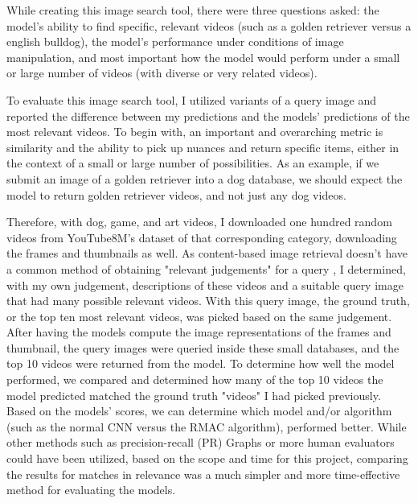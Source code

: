 \documentclass[10pt,twocolumn]{article}
\begin{document}
While creating this image search tool, there were three questions asked: the model's ability to find specific, relevant videos (such as a golden retriever versus a english bulldog), the model's performance under conditions of image manipulation, and most important how the model would perform under a small or large number of videos (with diverse or very related videos).

To evaluate this image search tool, I utilized variants of a query image and reported the difference between my predictions and the models' predictions of the most relevant videos. To begin with, an important and overarching metric is similarity and the ability to pick up nuances and return specific items, either in the context of a small or large number of possibilities. As an example, if we submit an image of a golden retriever into a dog database, we should expect the model to return golden retriever videos, and not just any dog videos.

Therefore, with dog, game, and art videos, I downloaded one hundred random videos from YouTube8M's dataset of that corresponding category, downloading the frames and thumbnails as well. As content-based image retrieval doesn't have a common method of obtaining "relevant judgements" for a query \cite{Muller2001 TODO}, I determined, with my own judgement, descriptions of these videos and a suitable query image that had many possible relevant videos. With this query image, the ground truth, or the top ten most relevant videos, was picked based on the same judgement. After having the models compute the image representations of the frames and thumbnail, the query images were queried inside these small databases, and the top 10 videos were returned from the model. To determine how well the model performed, we compared and determined how many of the top 10 videos the model predicted matched the ground truth "videos" I had picked previously. Based on the models' scores, we can determine which model and/or algorithm (such as the normal CNN versus the RMAC algorithm), performed better. While other methods such as precision-recall (PR) Graphs \cite{Muller2001 TODO} or more human evaluators could have been utilized, based on the scope and time for this project, comparing the results for matches in relevance was a much simpler and more time-effective method for evaluating the models.
\end{document}
